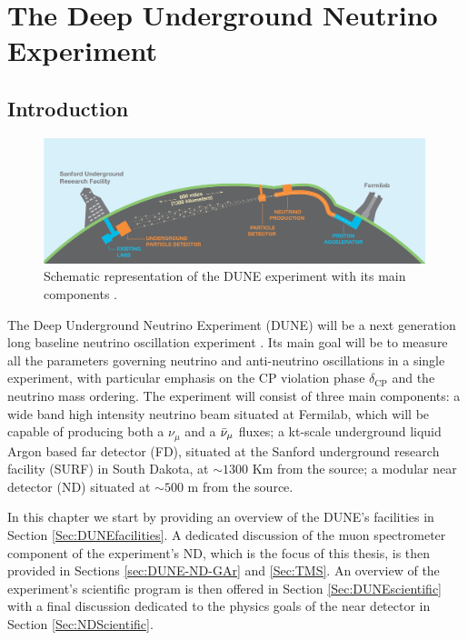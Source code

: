 

\chapter{\label{ch:3-DUNE}The Deep Underground Neutrino Experiment}


\minitoc
\section{Introduction} \label{ch3-Sec:Introduction}
\begin{figure}[!ht]
     \centering
     \includegraphics[width=0.99\textwidth]{figures/ch3-DUNE/LBNE_Graphic_061615_2016.jpg}
     \caption[Schematic representation of the DUNE experiment.]{Schematic representation of the DUNE experiment with its main components \cite{DUNE:2020TDR1}.}
        \label{fig:DUNEdiagram}
\end{figure}
The Deep Underground Neutrino Experiment (DUNE) will be a next generation long baseline neutrino oscillation experiment \cite{DUNE:2020TDR1}. Its main goal will be to measure all the parameters governing neutrino and anti-neutrino oscillations in a single experiment, with particular emphasis on the CP violation phase $\delta_\textrm{CP}$ and the neutrino mass ordering. The experiment will consist of three main components: a wide band high intensity neutrino beam situated at Fermilab, which will be capable of producing both a $\nu_\mu$ and a $\Bar{\nu}_\mu$ fluxes; a kt-scale underground liquid Argon based far detector (FD), situated at the Sanford underground research facility (SURF) in South Dakota, at $\sim1300$ Km from the source; a modular near detector (ND) situated at $\sim500$ m from the source. 

In this chapter we start by providing an overview of the DUNE's facilities in Section \ref{Sec:DUNEfacilities}. A dedicated discussion of the muon spectrometer component of the experiment's ND, which is the focus of this thesis, is then provided in Sections \ref{sec:DUNE-ND-GAr} and \ref{Sec:TMS}. An overview of the experiment's scientific program is then offered in Section \ref{Sec:DUNEscientific} with a final discussion dedicated to the physics goals of the near detector in Section \ref{Sec:NDScientific}.  



